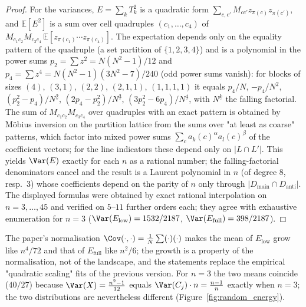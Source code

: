 \begin{proof}
For the variances, $E=\sum_k T_k^2$ is a quadratic form $\sum_{c,c'}M_{cc'}z_{\pi(c)}z_{\pi(c')}$,
and $\mathbb{E}[E^2]$ is a sum over cell quadruples $(c_1,\dots,c_4)$ of
$M_{c_1c_2}M_{c_3c_4}\,\mathbb{E}[z_{\pi(c_1)}\cdots z_{\pi(c_4)}]$. The expectation depends only on
the equality pattern of the quadruple (a set partition of $\{1,2,3,4\}$) and is a polynomial in the
power sums $p_2=\sum z^2=N(N^2-1)/12$ and $p_4=\sum z^4=N(N^2-1)(3N^2-7)/240$ (odd power sums
vanish): for blocks of sizes $(4)$, $(3,1)$, $(2,2)$, $(2,1,1)$, $(1,1,1,1)$ it equals
$p_4/N$, $-p_4/N^{\underline 2}$, $(p_2^2-p_4)/N^{\underline 2}$, $(2p_4-p_2^2)/N^{\underline 3}$,
$(3p_2^2-6p_4)/N^{\underline 4}$, with $N^{\underline k}$ the falling factorial. The sum of
$M_{c_1c_2}M_{c_3c_4}$ over quadruples with an exact pattern is obtained by M\"obius inversion on
the partition lattice from the sums over "at least as coarse" patterns, which factor into mixed power
sums $\sum_c a_k(c)^\alpha a_l(c)^\beta$ of the coefficient vectors; for the line indicators these
depend only on $|L\cap L'|$. This yields $\Var(E)$ exactly for each $n$ as a rational number; the
falling-factorial denominators cancel and the result is a Laurent polynomial in $n$ (of degree $8$,
resp.\ $3$) whose coefficients depend on the parity of $n$ only through $|D_{\mathrm{main}}\cap
D_{\mathrm{anti}}|$. The displayed formulas were obtained by exact rational interpolation on
$n=3,\dots,45$ and verified on $5$--$11$ further orders each; they agree with exhaustive enumeration
for $n=3$ ($\Var(E_{\mathrm{low}})=1532/2187$, $\Var(E_{\mathrm{full}})=398/2187$).
\end{proof}

\begin{remark}
The paper's normalisation $\Cov(\cdot,\cdot)=\frac1N\sum(\cdot)(\cdot)$ makes the mean of
$E_{\mathrm{low}}$ grow like $n^4/72$ and that of $E_{\mathrm{full}}$ like $n^2/6$; the growth is a
property of the normalisation, not of the landscape, and the statements replace the empirical
"quadratic scaling" fits of the previous version. For $n=3$ the two means coincide
($40/27$) because $\Var(X)=\frac{n^2-1}{12}$ equals $\Var(C_j)\cdot n = \frac{n-1}{n}$ exactly when
$n=3$; the two distributions are nevertheless different (Figure~\ref{fig:random_energy}).
\end{remark}

